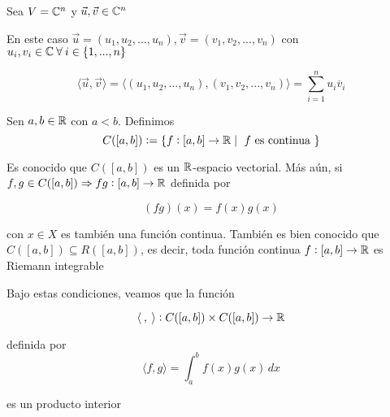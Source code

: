 \begin{eg}
    Sea $V = \mathbb{C}^n$ y $\vec{u}, \vec{v} \in \mathbb{C}^n$

    En este caso $\vec{u} = (u_1, u_2, ..., u_n), \vec{v} = (v_1, v_2, ..., v_n)$ con $u_i, v_i \in \mathbb{C} \: \forall \: i \in \{ 1, ..., n \}$

    $$\langle \vec{u}, \vec{v} \rangle = \langle  (u_1, u_2, ..., u_n) , (v_1, v_2, ..., v_n) \rangle = \sum_{i=1}^{n} u_i {\overline{v}}_{i}$$
\end{eg}


\begin{eg}
    Sen $a,b \in \mathbb{R}$ con $a < b$. Definimos 
    \begin{equation*}
        C([a,b]) := \{ f: [a,b] \to \mathbb{R} \mid \text{ $f$ es continua }\}
    \end{equation*}

    Es conocido que $ C([a,b])$ es un $\mathbb{R}$-espacio vectorial. Más aún, si $f,g \in C([a,b]) \Rightarrow fg : [a,b] \to \mathbb{R}$ definida por

    \begin{equation*}
        (fg)(x) = f(x)g(x)
    \end{equation*}

    con $x \in X$ es también una función continua. También es bien conocido que $ C([a,b]) \subseteq  R([a,b])$, es decir, toda función continua $f:[a,b] \to \mathbb{R}$ es Riemann integrable

    Bajo estas condiciones, veamos que la función

    \begin{equation*}
        \langle \: , \: \rangle : C([a,b]) \times C([a,b]) \to \mathbb{R}
    \end{equation*}

    definida por
    \begin{equation*}
         \langle f , g \rangle = \int_{a}^{b} f(x)g(x) \, dx
    \end{equation*}

    es un producto interior 
\end{eg}

